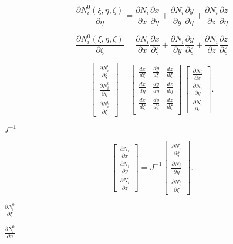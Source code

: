\documentclass{article}
\begin{document}
\[ \frac{\partial N^0_i(\xi, \eta, \zeta)}{\partial \eta} = \frac{\partial N_i}{\partial x} \frac{\partial x}{\partial \eta} + \frac{\partial N_i}{\partial y} \frac{\partial y}{\partial \eta} + \frac{\partial N_i}{\partial z} \frac{\partial z}{\partial \eta} \]
\pagebreak

\[ \frac{\partial N^0_i(\xi, \eta, \zeta)}{\partial \zeta} = \frac{\partial N_i}{\partial x} \frac{\partial x}{\partial \zeta} + \frac{\partial N_i}{\partial y} \frac{\partial y}{\partial \zeta} + \frac{\partial N_i}{\partial z} \frac{\partial z}{\partial \zeta} \]
\pagebreak

\[ \left[ {\begin{array}{c} \frac{\partial N^0_i}{\partial \xi} \\ \frac{\partial N^0_i}{\partial \eta} \\ \frac{\partial N^0_i}{\partial \zeta} \end{array}}\right] = \left[ { \begin{array}{ccc} \frac{dx}{d\xi} &\frac{dy}{d\xi} &\frac{dz}{d\xi} \\ \frac{dx}{d\eta} & \frac{dy}{d\eta} &\frac{dz}{d\eta} \\ \frac{dx}{d\zeta} & \frac{dy}{d\zeta} &\frac{dz}{d\zeta} \\ \end{array} } \right] \, \left[ {\begin{array}{c} \frac{\partial N_i}{\partial x} \\ \frac{\partial N_i}{\partial y} \\ \frac{\partial N_i}{\partial z}\end{array}}\right]. \]
\pagebreak

$ J^{-1} $
\pagebreak

\[ \left[ {\begin{array}{c} \frac{\partial N_i}{\partial x} \\ \frac{\partial N_i}{\partial y} \\ \frac{\partial N_i}{\partial z}\end{array}}\right] = J^{-1} \left[ {\begin{array}{c} \frac{\partial N^0_i}{\partial \xi} \\ \frac{\partial N^0_i}{\partial \eta} \\ \frac{\partial N^0_i}{\partial \zeta}\end{array}}\right]. \]
\pagebreak

$ \frac{\partial N^0_i}{ \partial \xi} $
\pagebreak

$ \frac{\partial N^0_i} {\partial \eta } $
\pagebreak
\end{document}
